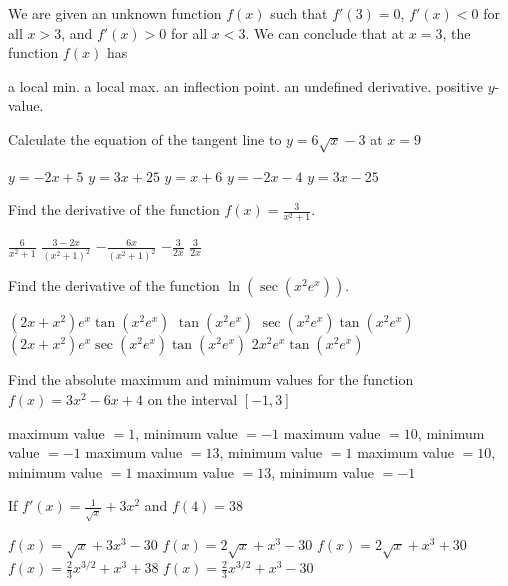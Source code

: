\documentclass[11pt]{article}
\begin{document}
\begin{questions}
\begin{multiplechoice}{5}
\begin{questions}
\begin{multiplechoice}{5}
\begin{questions}
\begin{multiplechoice}{5}
\question We are given an unknown function $f(x)$ such that $f'(3) = 0$, $f'(x) < 0$ for all $x > 3$, and $f'(x) > 0$ for all $x < 3$.
We can conclude that at $x = 3$, the function $f(x)$ has 
\begin{answers}{3}
\ans a local min.
\ans a local max.
\ans an inflection point.
\ans an undefined derivative.
\ans positive $y$-value.
\end{answers}

\question Calculate the equation of the tangent line to $y = 6 \sqrt{x} - 3$ at $x = 9$
\begin{answers}{2}
\ans $y = -2x + 5$
\ans $y = 3x + 25$
\ans $y = x + 6$
\ans $y = -2x -4$
\ans $y = 3x - 25$
\end{answers}


\question Find the derivative of the function $\displaystyle f(x) = \frac{3}{x^2 +1}$.
\begin{answers}{2}
\ans $ \displaystyle \frac{6}{x^2 + 1}$
\ans $ \displaystyle  \frac{3 - 2x }{(x^2 + 1)^2}$
\ans $ \displaystyle -\frac{6x}{(x^2 + 1)^2}$
\ans $ \displaystyle  - \frac{3}{2x}$
\ans $ \displaystyle  \frac{3}{2x}$
\end{answers}

\question Find the derivative of the function $\ln(\sec(x^2 e^x))$.
\begin{answers}{2}
\ans $(2x + x^2)e^x \tan(x^2 e^x)$
\ans $\tan(x^2 e^x)$
\ans $ \sec(x^2 e^x)\tan(x^2 e^x)$
\ans $(2x + x^2)e^x \sec(x^2 e^x)\tan(x^2 e^x)$
\ans $2x^2e^x \tan(x^2 e^x)$
\end{answers}




\question Find the absolute maximum and minimum values for the function 
$f(x) = 3x^2 - 6x + 4$ on the interval $[-1, 3]$
\begin{answers}{1}
\ans maximum value $= 1$, minimum value $ = -1$
\ans maximum value $= 10$, minimum value $ = -1$
\ans maximum value $= 13$, minimum value $ = 1$
\ans maximum value $= 10$, minimum value $ = 1$
\ans maximum value $= 13$, minimum value $ = -1$
\end{answers}


\question If $f'(x) = \frac{1}{\sqrt{x}} + 3x^2$ and $f(4) = 38$
\begin{answers}{2}
\ans $f(x) = \sqrt{x} + 3x^3 -30$
\ans $f(x) = 2\sqrt{x} + x^3 - 30$
\ans $f(x) = 2\sqrt{x} + x^3 + 30$
\ans $f(x) = \frac{2}{3} x^{3/2} + x^3 + 38$
\ans $f(x) = \frac{2}{3} x^{3/2} + x^3 - 30$ 
\end{answers}



\end{multiplechoice}
\end{questions}
\end{multiplechoice}
\end{questions}
\end{multiplechoice}
\end{questions}
\end{document}
